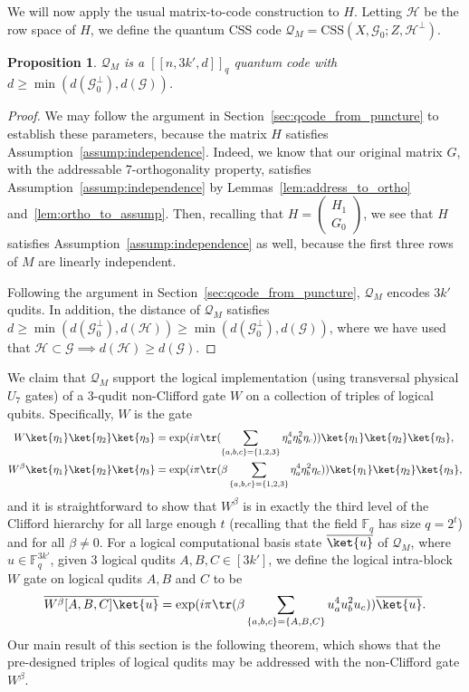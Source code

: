 \documentclass[11pt]{article}
\newtheorem{proposition}[theorem]{Proposition}
\theoremstyle{definition}
\renewcommand{\ge}{\geqslant}
\renewcommand{\geq}{\geqslant}
\newcommand{\CSS}{\text{CSS}}
\newcommand{\cG}{\mathcal{G}}
\newcommand{\cH}{\mathcal{H}}
\newcommand{\qcode}{\mathcal{Q}}
\newcommand*{\ol}{\overline}
\begin{document}
We will now apply the usual matrix-to-code construction to $H$. Letting $\cH$ be the row space of $H$, we define the quantum CSS code $\qcode_M = \CSS(X, \cG_0; Z, \cH^\perp)$. 
\begin{proposition}
    $\qcode_M$ is a $[[n, 3k', d]]_q$ quantum code with $d\ge \min(d(\cG_0^\perp), d(\cG))$.
\end{proposition}
\begin{proof}
We may follow the argument in Section~\ref{sec:qcode_from_puncture} to establish these parameters, because the matrix $H$ satisfies Assumption~\ref{assump:independence}. Indeed, we know that our original matrix $G$, with the addressable 7-orthogonality property, satisfies Assumption~\ref{assump:independence} by Lemmas~\ref{lem:address_to_ortho} and~\ref{lem:ortho_to_assump}. Then, recalling that $H = \begin{pmatrix}
    H_1\\G_0
\end{pmatrix}$, we see that $H$ satisfies Assumption~\ref{assump:independence} as well, because the first three rows of $M$ are linearly independent.

Following the argument in Section~\ref{sec:qcode_from_puncture}, 
$\qcode_M$ encodes $3k'$ qudits. 
In addition, the distance of $\qcode_M$ satisfies $d\ge \min(d(\cG_0^\perp), d(\cH)) \ge \min(d(\cG_0^\perp),d(\cG))$, where we have used that $\mathcal{H}\subset\mathcal{G} \implies d(\mathcal{H}) \geq d(\mathcal{G})$.
\end{proof}

We claim that $\qcode_M$ support the logical implementation (using transversal physical $U_7$ gates) of a 3-qudit non-Clifford gate $W$ on a collection of triples of logical qubits. 
Specifically, $W$ is the gate
\begin{align}
    W \ket{\eta_1}\ket{\eta_2}\ket{\eta_3}
    &= \exp(i\pi \tr( \sum_{\{a,b,c\} = \{1, 2, 3\}}\eta_a^4\eta_b^2\eta_c
     ))
    \ket{\eta_1}\ket{\eta_2}\ket{\eta_3}, \\
    W^\beta \ket{\eta_1}\ket{\eta_2}\ket{\eta_3}
    &= 
    \exp(i\pi \tr( \beta \sum_{\{a,b,c\} = \{1, 2, 3\}}\eta_a^4\eta_b^2\eta_c
     ))
    \ket{\eta_1}\ket{\eta_2}\ket{\eta_3},
\end{align}
and it is straightforward to show that $W^\beta$ is in exactly the third level of the Clifford hierarchy for all large enough $t$ (recalling that the field $\mathbb{F}_q$ has size $q=2^t$) and for all $\beta \neq 0$.
For a logical computational basis state $\ol{\ket{u}}$ of $\qcode_M$, where $u \in \mathbb{F}_q^{3k'}$,
given 3 logical qudits $A, B, C\in [3k']$, we define the logical intra-block $W$ gate on logical qudits $A, B$ and $C$ to be 
\begin{equation}
    \ol{W^\beta [A,B,C]\ket{u}} = 
    \exp(i\pi \tr( \beta \sum_{\{a,b,c\} = \{A,B,C\}}u_a^4u_b^2u_c
     ))
     \ol{\ket{u}}. 
\end{equation}
Our main result of this section is the following theorem, which shows that the pre-designed triples of logical qudits may be addressed with the non-Clifford gate $W^\beta$.
\end{document}
